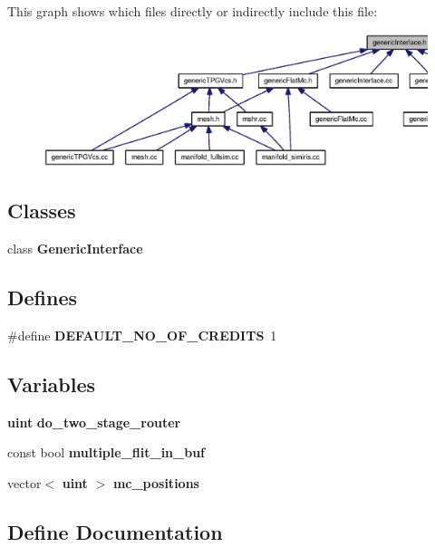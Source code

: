 This graph shows which files directly or indirectly include this file:\nopagebreak
\begin{figure}[H]
\begin{center}
\leavevmode
\includegraphics[width=420pt]{genericInterface_8h__dep__incl}
\end{center}
\end{figure}
\subsection*{Classes}
\begin{CompactItemize}
\item 
class {\bf GenericInterface}
\end{CompactItemize}
\subsection*{Defines}
\begin{CompactItemize}
\item 
\#define {\bf DEFAULT\_\-NO\_\-OF\_\-CREDITS}~1
\end{CompactItemize}
\subsection*{Variables}
\begin{CompactItemize}
\item 
{\bf uint} {\bf do\_\-two\_\-stage\_\-router}
\item 
const bool {\bf multiple\_\-flit\_\-in\_\-buf}
\item 
vector$<$ {\bf uint} $>$ {\bf mc\_\-positions}
\end{CompactItemize}


\subsection{Define Documentation}
